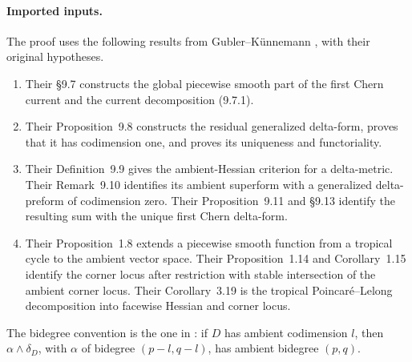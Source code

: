 \paragraph{Imported inputs.}
The proof uses the following results from Gubler--K\"unnemann
\cite{GK17}, with their original hypotheses.
\begin{enumerate}
\item Their \S9.7 constructs the global piecewise smooth part of the first
 Chern current and the current decomposition (9.7.1).
\item Their Proposition~9.8 constructs the residual generalized delta-form,
 proves that it has codimension one, and proves its uniqueness and
 functoriality.
\item Their Definition~9.9 gives the ambient-Hessian criterion for a
 delta-metric.  Their Remark~9.10 identifies its ambient superform with a
 generalized delta-preform of codimension zero.  Their Proposition~9.11 and
 \S9.13 identify the resulting sum with the unique first Chern delta-form.
\item Their Proposition~1.8 extends a piecewise smooth function from a
 tropical cycle to the ambient vector space.  Their Proposition~1.14 and
 Corollary~1.15 identify the corner locus after restriction with stable
 intersection of the ambient corner locus.  Their Corollary~3.19 is the
 tropical Poincar\'e--Lelong decomposition into facewise Hessian and corner
 locus.
\end{enumerate}
The bidegree convention is the one in \cite[Definition~2.9 and
Example~2.10]{GK17}: if \(D\) has ambient codimension \(l\), then
\(\alpha\wedge\delta_D\), with \(\alpha\) of bidegree \((p-l,q-l)\), has
ambient bidegree \((p,q)\).

